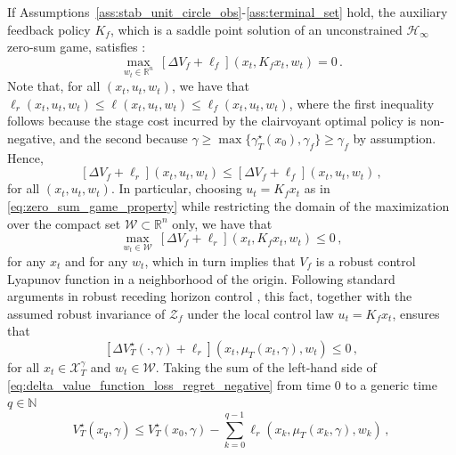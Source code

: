 \documentclass[conference]{IEEEtran}
\begin{document}
    If Assumptions~\ref{ass:stab_unit_circle_obs}-\ref{ass:terminal_set} hold, the auxiliary feedback policy $K_f$, which is a saddle point solution of an unconstrained $\mathcal{H}_\infty$ zero-sum game, satisfies \cite{bacsar2008h}:
    \begin{equation}
        \label{eq:zero_sum_game_property}
        \max_{w_t \in \mathbb{R}^n} ~ \left[\Delta V_f + \ell_f\right](x_t, K_f x_t, w_t) = 0\,.
    \end{equation}
    Note that, for all $(x_t, u_t, w_t)$, we have that $\ell_r(x_t, u_t, w_t) \leq \ell(x_t, u_t, w_t) \leq \ell_f(x_t, u_t, w_t)$, where the first inequality follows because the stage cost incurred by the clairvoyant optimal policy is non-negative, and the second because $\gamma \geq \operatorname{max}\{\gamma_T^\star(x_0), \gamma_f\} \geq \gamma_f$ by assumption. Hence,
    \begin{equation*}
        \left[\Delta V_f + \ell_r\right](x_t, u_t, w_t) \leq \left[\Delta V_f + \ell_f\right](x_t, u_t, w_t)\,,
    \end{equation*}
    for all $(x_t, u_t, w_t)$. In particular, choosing $u_t = K_f x_t$ as in \eqref{eq:zero_sum_game_property} while restricting the domain of the maximization over the compact set $\mathcal{W} \subset \mathbb{R}^n$ only, we have that
    \begin{equation*}
        \label{eq:delta_terminal_cost_loss_regret_negative}
        \max_{w_t \in \mathcal{W}} ~ \left[\Delta V_f + \ell_r\right](x_t, K_f x_t, w_t) \leq 0\,,
    \end{equation*}
    for any $x_t$ and for any $w_t$, which in turn implies that $V_f$ is a robust control Lyapunov function in a neighborhood of the origin. Following standard arguments in robust receding horizon control \cite[Sect. 4]{mayne2000constrained}, this fact, together with the assumed robust invariance of $\mathcal{Z}_f$ under the local control law $u_t = K_f x_t$, ensures that
    \begin{equation}
        \label{eq:delta_value_function_loss_regret_negative}
        \left[\Delta V_T^\star(\cdot, \gamma) + \ell_r\right](x_t, \mu_T(x_t, \gamma), w_t) \leq 0\,,
    \end{equation}
    for all $x_t \in \mathcal{X}_T^\gamma$ and $w_t \in \mathcal{W}$. Taking the sum of the left-hand side of \eqref{eq:delta_value_function_loss_regret_negative} from time $0$ to a generic time $q \in \mathbb{N}$
    \begin{equation*}
        V_T^\star(x_q, \gamma) \leq V_T^\star(x_0, \gamma) - \sum_{k=0}^{q-1} \ell_r (x_k, \mu_T(x_k, \gamma), w_{k})\,,
    \end{equation*}
\end{document}
